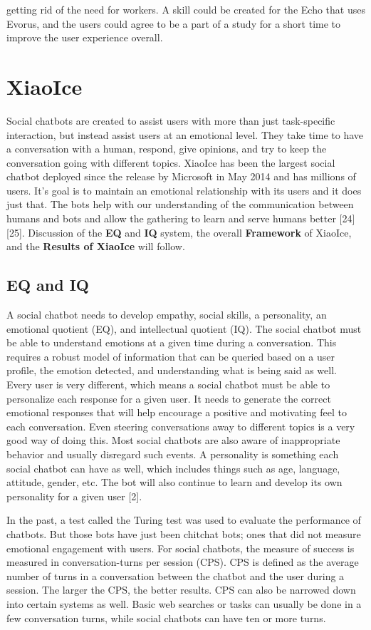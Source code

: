 \documentclass[letterpaper, 10 pt, conference]{IEEEtran}
\begin{document}
getting rid of the need for workers. A skill could be created for the Echo that uses Evorus, and the users could agree to be a part of a study for a short time to improve the user experience overall.

\section{XiaoIce}
Social chatbots are created to assist users with more than just task-specific interaction, but instead assist users at an emotional level. They take time to have a conversation with a human, respond, give opinions, and try to keep the conversation going with different topics. XiaoIce has been the largest social chatbot deployed since the release by Microsoft in May 2014 and has millions of users. It's goal is to maintain an emotional relationship with its users and it does just that. The bots help with our understanding of the communication between humans and bots and allow the gathering to learn and serve humans better [24][25]. Discussion of the \textbf{EQ} and \textbf{IQ} system, the overall \textbf{Framework} of XiaoIce, and the \textbf{Results of XiaoIce} will follow.

\subsection{EQ and IQ}
A social chatbot needs to develop empathy, social skills, a personality, an emotional quotient (EQ), and intellectual quotient (IQ). The social chatbot must be able to understand emotions at a given time during a conversation. This requires a robust model of information that can be queried based on a user profile, the emotion detected, and understanding what is being said as well. Every user is very different, which means a social chatbot must be able to personalize each response for a given user. It needs to generate the correct emotional responses that will help encourage a positive and motivating feel to each conversation. Even steering conversations away to different topics is a very good way of doing this. Most social chatbots are also aware of inappropriate behavior and usually disregard such events. A personality is something each social chatbot can have as well, which includes things such as age, language, attitude, gender, etc. The bot will also continue to learn and develop its own personality for a given user [2].
\par In the past, a test called the Turing test was used to evaluate the performance of chatbots. But those bots have just been chitchat bots; ones that did not measure emotional engagement with users. For social chatbots, the measure of success is measured in conversation-turns per session (CPS). CPS is defined as the average number of turns in a conversation between the chatbot and the user during a session. The larger the CPS, the better results. CPS can also be narrowed down into certain systems as well. Basic web searches or tasks can usually be done in a few conversation turns, while social chatbots can have ten or more turns.
\end{document}
